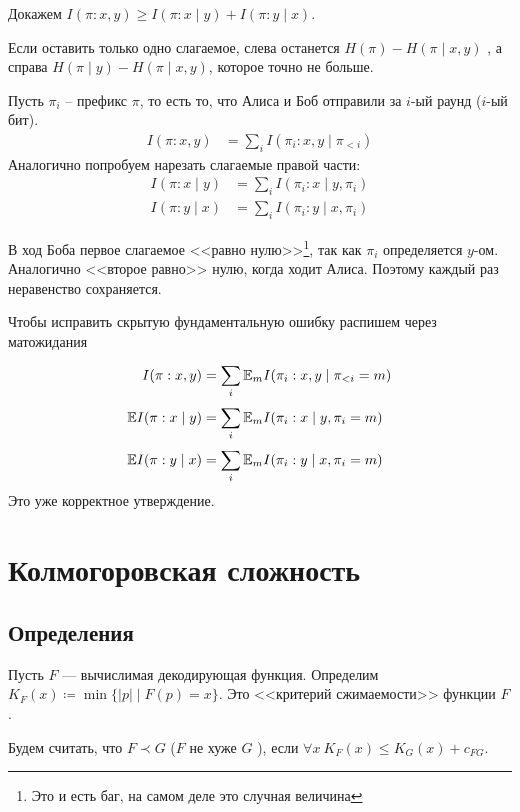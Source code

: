 Докажем $ I( \pi : x, y) \ge I( \pi : x \mid y) + I(\pi : y  \mid x)$. 

Если оставить только одно слагаемое,  слева останется
$ H( \pi ) - H( \pi \mid x, y) $
, а справа 
$ H( \pi \mid y ) - H( \pi \mid x, y) $, которое точно не больше.

Пусть $  \pi_i$ -- префикс $  \pi$, то есть то, что Алиса и Боб отправили за $ i$-ый раунд ($ i$-ый бит).
\begin{align*}
	I( \pi : x, y) &= \sum_{i}^{} I( \pi_i : x, y \mid \pi_{< i}) 
\end{align*}
Аналогично попробуем нарезать слагаемые правой части:
\begin{align*}
	I( \pi : x \mid y) & = \sum_{i}^{} I( \pi_i : x \mid y, \pi_i) \\
	I( \pi : y \mid x) & = \sum_{i}^{} I( \pi_i : y \mid x, \pi_i) 
\end{align*}

В ход Боба первое слагаемое <<равно нулю>>\footnote{Это и есть баг, на самом деле это случная величина}, так как $  \pi_i$ определяется $ y $-ом. Аналогично <<второе равно>> нулю, когда ходит Алиса. Поэтому каждый раз неравенство сохраняется. 

Чтобы исправить скрытую фундаментальную ошибку распишем через матожидания
\begin{align*}
	I( \pi : x, y) &= \sum_{i}^{} \mathbb{E}_{m}I( \pi_i : x, y \mid \pi_{< i} = m) \\
	\mathbb{E} I( \pi : x \mid y) & = \sum_{i}^{} \mathbb{E}_m I( \pi_i : x \mid y, \pi_i = m) \\
	\mathbb{E} I( \pi : y \mid x) & = \sum_{i}^{} \mathbb{E}_mI( \pi_i : y \mid x, \pi_i = m) 
\end{align*}
Это уже корректное утверждение.


\chapter{Колмогоровская сложность}
\section{Определения}

Пусть $ F$ --- вычислимая декодирующая функция.
Определим $ K_F(x) \coloneqq \min \{\lvert p \rvert \mid F(p) = x\}$. Это <<критерий сжимаемости>> функции $ F$.

Будем считать, что $ F \prec G$ ($ F$ не хуже  $ G$ ), если $ \forall x ~ K_F(x) \le K_G(x) + c_{FG}$.

